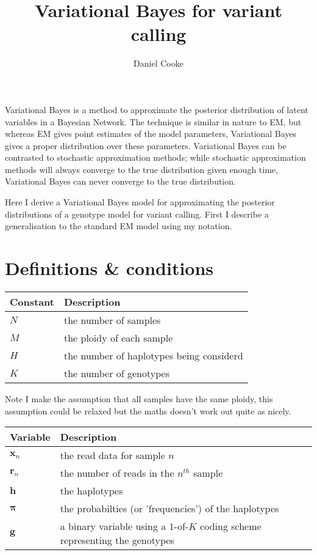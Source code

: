 \documentclass{article}
\title{Variational Bayes for variant calling}
\author{Daniel Cooke}
\date{}
\begin{document}
\maketitle

Variational Bayes is a method to approximate the posterior distribution of latent variables in a Bayesian Network. The technique is similar in nature to EM, but whereas EM gives point estimates of the model parameters, Variational Bayes gives a proper distribution over these parameters.  Variational Bayes can be contrasted to stochastic approximation methods; while stochastic approximation methods will always converge to the true distribution given enough time, Variational Bayes can never converge to the true distribution.

Here I derive a Variational Bayes model for approximating the posterior distributions of a genotype model for variant calling. First I describe a generalisation to the standard EM model using my notation.

\section{Definitions \& conditions}

\begin{center}
\begin{tabular}{ll}
Constant & Description \\
\hline
$N$ & the number of samples \\
$M$ & the ploidy of each sample \\
$H$ & the number of haplotypes being considerd \\
$K$ & the number of genotypes \\
\hline
\end{tabular}
\end{center}

Note I make the assumption that all samples have the same ploidy, this assumption could be relaxed but the maths doesn't work out quite as nicely.

\begin{center}
\begin{tabular}{ll}
Variable & Description \\
\hline
$\boldsymbol{x}_n$ & the read data for sample $n$ \\
$\boldsymbol{r}_n$ & the number of reads in the $n^{th}$ sample \\
$\boldsymbol{h}$ & the haplotypes \\
$\boldsymbol{\pi}$ & the probabilties (or 'frequencies') of the haplotypes \\
$\boldsymbol{g}$ & a binary variable using a $1$-of-$K$ coding scheme representing the genotypes \\
\hline
\end{tabular}
\end{center}
\end{document}
